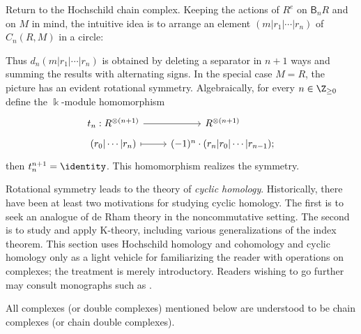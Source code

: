 Return to the Hochschild chain complex. Keeping the actions of $R^e$ on
$\mathsf{B}_nR$ and on $M$ in mind, the intuitive idea is to arrange an
element $(m|r_1|\cdots|r_n)$ of $C_n(R,M)$ in a circle:
\begin{center}\end{center}
Thus $d_n(m|r_1|\cdots|r_n)$ is obtained by deleting a separator in $n+1$
ways and summing the results with alternating signs. In the special case
$M=R$, the picture has an evident rotational symmetry. Algebraically, for
every $n\in\Z_{\geq0}$ define the $\Bbbk$-module homomorphism
\[\begin{tikzcd}[row sep=tiny]
	t_n: R^{\otimes (n+1)} \arrow[r] & R^{\otimes (n+1)} \\
	(r_0 | \cdots | r_n) \arrow[mapsto, r]
	& (-1)^n \cdot (r_n | r_0 | \cdots | r_{n-1}) ;
\end{tikzcd}\]
then $t_n^{n+1}=\identity$. This homomorphism realizes the symmetry.

Rotational symmetry leads to the theory of \emph{cyclic homology}.
Historically, there have been at least two motivations for studying cyclic
homology. The first is to seek an analogue of de Rham theory in the
noncommutative setting. The second is to study and apply K-theory, including
various generalizations of the index theorem. This section uses Hochschild
homology and cohomology and cyclic homology only as a light vehicle for
familiarizing the reader with operations on complexes; the treatment is
merely introductory. Readers wishing to go further may consult monographs
such as \cite{Lo98, Wi19}.

All complexes (or double complexes) mentioned below are understood to be
chain complexes (or chain double complexes).

